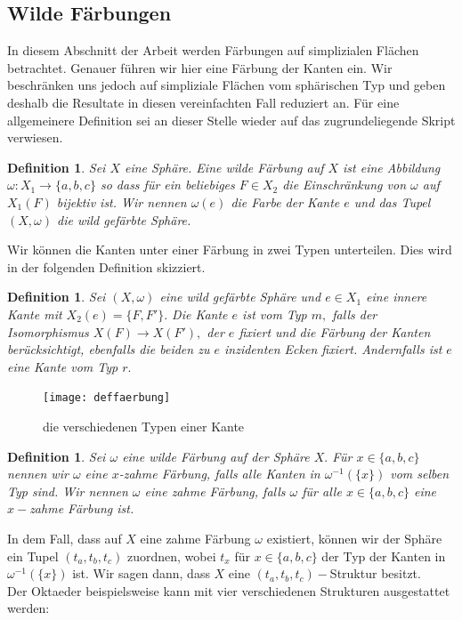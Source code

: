 \documentclass[12pt,titlepage,twoside,cleardoublepage]{article}
\theoremstyle{nummermitklammern}
\newtheorem{definition}[temp]{Definition}
\newtheorem{definition}[zahl]{Definition}
\numberwithin{equation}{section}
\begin{document}
\subsection{Wilde Färbungen}
In diesem Abschnitt der Arbeit werden Färbungen auf simplizialen Flächen betrachtet. Genauer führen wir hier eine Färbung der Kanten ein. Wir beschränken uns jedoch auf simpliziale Flächen vom sphärischen Typ und geben deshalb die Resultate in diesen vereinfachten Fall reduziert an. Für eine allgemeinere Definition sei an dieser Stelle wieder auf das zugrundeliegende Skript verwiesen.
\begin{definition}
Sei $X$ eine Sphäre. Eine \emph{wilde Färbung} auf $X$ ist eine Abbildung $\omega:X_1\to \{a,b,c\}$ so dass für ein beliebiges $F\in X_2$ die Einschränkung von $\omega$ auf $X_1(F)$ bijektiv ist. Wir nennen $\omega(e)$ die \emph{Farbe} der Kante $e$ und das Tupel $(X,\omega)$ die \emph{wild gefärbte Sphäre}. 
\end{definition}
Wir können die Kanten unter einer Färbung in zwei Typen unterteilen. Dies wird in der folgenden Definition skizziert.
\begin{definition}
Sei $(X,\omega)$ eine wild gefärbte Sphäre und $e\in X_1$ eine innere Kante mit $X_2(e)=\{F,F'\}.$ Die Kante $e$ ist vom Typ $m,$ falls der Isomorphismus $X(F)\to X(F'),$ der $e$ fixiert und die Färbung der Kanten berücksichtigt, ebenfalls die beiden zu $e$ inzidenten Ecken fixiert. Andernfalls ist $e$ eine Kante vom Typ $r.$
\end{definition}
\begin{figure}[H]
\begin{center}
\texttt{[image: deffaerbung]}
\end{center}
\caption{die verschiedenen Typen einer Kante}
\end{figure}
\begin{definition}
Sei $\omega$ eine wilde Färbung auf der Sphäre $X.$ Für $x\in \{a,b,c\}$ nennen wir $\omega$ eine \emph{$x$-zahme} Färbung, falls  alle Kanten in $\omega^{-1}(\{x\})$ vom selben Typ sind. Wir nennen $\omega$ eine \emph{zahme Färbung}, falls $\omega$ für alle $x\in \{a,b,c\}$ eine $x-$zahme Färbung ist. 
\end{definition}
In dem Fall, dass auf $X$ eine zahme Färbung $\omega$ existiert, können wir der Sphäre ein Tupel $(t_a,t_b,t_c)$ zuordnen, wobei $t_x$ für $x\in \{a,b,c\}$ der Typ der Kanten in $\omega^{-1}(\{x\})$ ist. Wir sagen dann, dass $X$ eine $(t_a,t_b,t_c)-$Struktur besitzt.\\
Der Oktaeder beispielsweise kann mit vier verschiedenen Strukturen ausgestattet werden:
\end{document}
